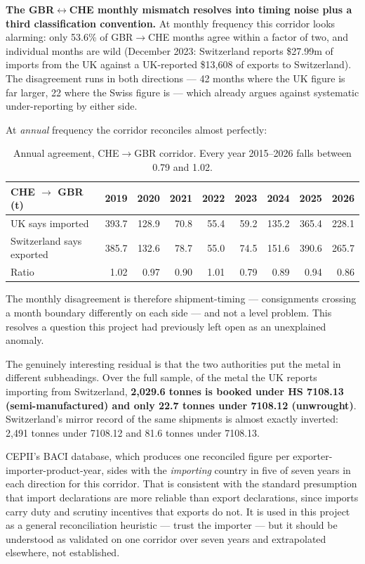 \documentclass[11pt,a4paper]{article}
\begin{document}
\textbf{The GBR$\leftrightarrow$CHE monthly mismatch resolves into timing noise plus a third
classification convention.} At monthly frequency this corridor looks alarming: only 53.6\% of
GBR$\to$CHE months agree within a factor of two, and individual months are wild (December 2023:
Switzerland reports \$27.99m of imports from the UK against a UK-reported \$13{,}608 of exports
to Switzerland). The disagreement runs in both directions --- 42 months where the UK figure is
far larger, 22 where the Swiss figure is --- which already argues against systematic
under-reporting by either side.

At \emph{annual} frequency the corridor reconciles almost perfectly:

\begin{table}[h]
\centering
\small
\begin{tabular}{@{}lrrrrrrrr@{}}
\toprule
\textbf{CHE $\to$ GBR (t)} & \textbf{2019} & \textbf{2020} & \textbf{2021} & \textbf{2022} &
\textbf{2023} & \textbf{2024} & \textbf{2025} & \textbf{2026} \\
\midrule
UK says imported & 393.7 & 128.9 & 70.8 & 55.4 & 59.2 & 135.2 & 365.4 & 228.1 \\
Switzerland says exported & 385.7 & 132.6 & 78.7 & 55.0 & 74.5 & 151.6 & 390.6 & 265.7 \\
Ratio & 1.02 & 0.97 & 0.90 & 1.01 & 0.79 & 0.89 & 0.94 & 0.86 \\
\bottomrule
\end{tabular}
\caption{Annual agreement, CHE$\to$GBR corridor. Every year 2015--2026 falls between 0.79 and
1.02.}
\end{table}

The monthly disagreement is therefore shipment-timing --- consignments crossing a month boundary
differently on each side --- and not a level problem. This resolves a question this project had
previously left open as an unexplained anomaly.

The genuinely interesting residual is that the two authorities put the metal in different
subheadings. Over the full sample, of the metal the UK reports importing from Switzerland,
\textbf{2{,}029.6 tonnes is booked under HS 7108.13 (semi-manufactured) and only 22.7 tonnes
under 7108.12 (unwrought)}. Switzerland's mirror record of the same shipments is almost exactly
inverted: 2{,}491 tonnes under 7108.12 and 81.6 tonnes under 7108.13.

CEPII's BACI database, which produces one reconciled figure per exporter-importer-product-year,
sides with the \emph{importing} country in five of seven years in each direction for this
corridor. That is consistent with the standard presumption that import declarations are more
reliable than export declarations, since imports carry duty and scrutiny incentives that
exports do not. It is used in this project as a general reconciliation heuristic --- trust the
importer --- but it should be understood as validated on one corridor over seven years and
extrapolated elsewhere, not established.
\end{document}
